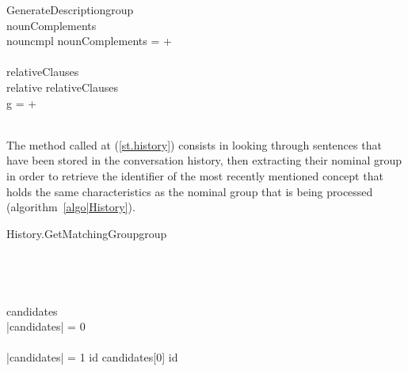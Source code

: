\documentclass[11pt]{article}
\begin{document}
\begin{pseudocode}[ruled]{GenerateDescription}{group}
   \\  
   nounComplements \GETS {} \\
   \FOREACH nouncmpl \in nounComplements \DO
      =  + {}\\
   
   
   \\  
   relativeClauses \GETS {} \\
   \FOREACH relative \in relativeClauses \DO
   	\BEGIN
   	  \GETS {} \\
   	 \FOREACH g \in {} \DO
     	 =  + {}
    \END\\
     
   \\
\ENDPROCEDURE
\end{pseudocode}

The method called at (\ref{st.history}) consists in looking through sentences 
that have been stored in the conversation history, then extracting their nominal
group in order to retrieve the identifier of the most recently mentioned 
concept that holds the same characteristics as the nominal group that is being 
processed (algorithm~\ref{algo|History}).

\begin{pseudocode}[ruled]{History.GetMatchingGroup}{group}
\label{algo|History}
\\
 \GETS {}\\
 \\
 \\
	 \GETS {} \\ 
	
	candidates \GETS {} \cap {}\\
	\IF \left|{candidates}\right| = 0 \THEN
    \BEGIN
       \\
      \EXIT \\
    \END
   \ELSEIF \left|{candidates}\right| = 1 \THEN
      id \GETS candidates[0]
   \ELSE
   	  id \GETS {}\\
\ENDPROCEDURE
\end{pseudocode}
\end{document}
